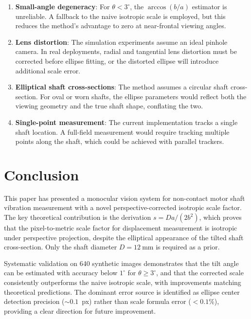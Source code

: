 \documentclass[journal]{IEEEtran}
\begin{document}
\begin{enumerate}
\item \textbf{Small-angle degeneracy}: For $\theta < 3^{\circ}$, the
$\arccos(b/a)$ estimator is unreliable. A fallback to the naive isotropic
scale is employed, but this reduces the method's advantage to zero at
near-frontal viewing angles.
\item \textbf{Lens distortion}: The simulation experiments assume an ideal
pinhole camera. In real deployments, radial and tangential lens distortion
must be corrected before ellipse fitting, or the distorted ellipse will
introduce additional scale error.
\item \textbf{Elliptical shaft cross-sections}: The method assumes a circular
shaft cross-section. For oval or worn shafts, the ellipse parameters would
reflect both the viewing geometry and the true shaft shape, conflating the
two.
\item \textbf{Single-point measurement}: The current implementation tracks
a single shaft location. A full-field measurement would require tracking
multiple points along the shaft, which could be achieved with parallel
trackers.
\end{enumerate}

\section{Conclusion}

This paper has presented a monocular vision system for non-contact motor shaft
vibration measurement with a novel perspective-corrected isotropic scale
factor. The key theoretical contribution is the derivation
$s = D a / (2 b^{2})$, which proves that the pixel-to-metric scale factor for
displacement measurement is isotropic under perspective projection, despite the
elliptical appearance of the tilted shaft cross-section. Only the shaft diameter
$D = 12~\text{mm}$ is required as a prior.

Systematic validation on 640 synthetic images demonstrates that the tilt angle
can be estimated with accuracy below $1^{\circ}$ for $\theta \geq 3^{\circ}$,
and that the corrected scale consistently outperforms the naive isotropic scale,
with improvements matching theoretical predictions. The dominant error source
is identified as ellipse center detection precision ($\sim 0.1$~px) rather
than scale formula error ($< 0.1\%$), providing a clear direction for future
improvement.
\end{document}

